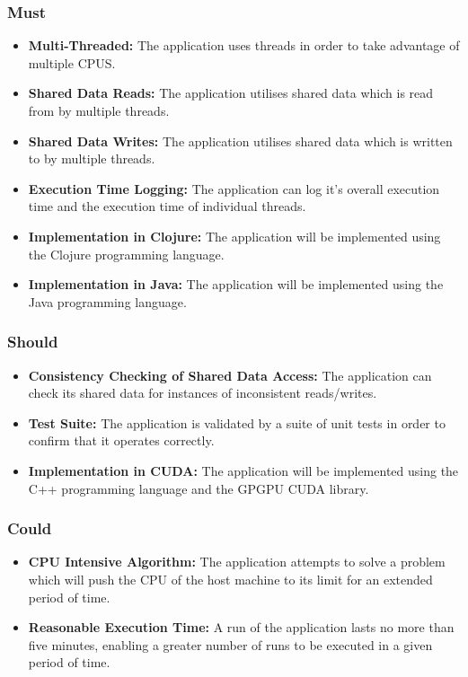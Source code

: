 \documentclass[12pt,a4paper]{article}
\begin{document}
\subsubsection{Must}

\begin{itemize} \itemsep0pt
        \item \textbf{Multi-Threaded:} The application uses threads in order to take advantage of multiple CPUS.
        \item \textbf{Shared Data Reads:} The application utilises shared data which is read from by multiple threads.
        \item \textbf{Shared Data Writes:} The application utilises shared data which is written to by multiple threads.
        \item \textbf{Execution Time Logging:} The application can log it's overall execution time and the execution time of individual threads.
        \item \textbf{Implementation in Clojure:} The application will be implemented using the Clojure programming language.
        \item \textbf{Implementation in Java:} The application will be implemented using the Java programming language.
\end{itemize}

\subsubsection{Should}

\begin{itemize} \itemsep0pt
        \item \textbf{Consistency Checking of Shared Data Access:} The application can check its shared data for instances of inconsistent reads/writes.
        \item \textbf{Test Suite:} The application is validated by a suite of unit tests in order to confirm that it operates correctly.
        \item \textbf{Implementation in CUDA:} The application will be implemented using the C++ programming language and the GPGPU CUDA library.
\end{itemize}

\subsubsection{Could}

\begin{itemize} \itemsep0pt
        \item \textbf{CPU Intensive Algorithm:} The application attempts to solve a problem which will push the CPU of the host machine to its limit for an extended period of time. 
        \item \textbf{Reasonable Execution Time:} A run of the application lasts no more than five minutes, enabling a greater number of runs to be executed in a given period of time.
\end{itemize}
\end{document}
